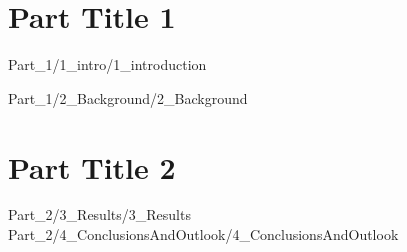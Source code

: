 \documentclass[titlepage,chapternotes]{utsthesis}
\begin{document}
\bibliographyunit[\chapter]

\Year{\thesisDate}
\School{\UTS}

\prelimpages
%
\titlepage
\thesissignaturepage
\dedication{Dedication}
\abstract{
    \blindtext
}

\acknowledgments{
    \blindtext
}
\tableofcontents
\listoffigures
\listoftables
\abbreviations
\textpages
{} %
%

\part{Part Title 1}

{Part_1/1_intro/1_introduction}

{Part_1/2_Background/2_Background}

\part{Part Title 2}

{Part_2/3_Results/3_Results}
{Part_2/4_ConclusionsAndOutlook/4_ConclusionsAndOutlook}
\end{document}
